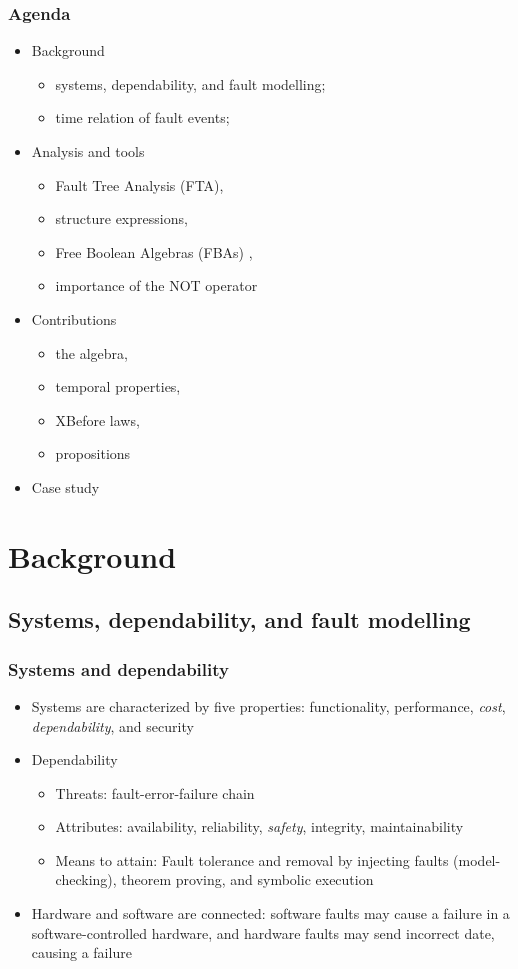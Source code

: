 \documentclass{beamer}
\def\FTA{Fault Tree Analysis (FTA)\gdef\FTA{FTA\xspace}\xspace}
\def\FBA{%
	Free Boolean Algebra (FBA)%
	\gdef\FBA{FBA\xspace}%
	\gdef\FBAs{FBAs\xspace}%
	\gdef\iFBA{an FBA\xspace}%
	\xspace%
}
\def\FBAs{%
	Free Boolean Algebras (FBAs)%
	\gdef\FBA{FBA\xspace}%
	\gdef\FBAs{FBAs\xspace}%
	\gdef\iFBA{an FBA\xspace}%
	\xspace%
}
\def\iFBA{%
	a Free Boolean Algebra (FBA)%
	\gdef\FBA{FBA\xspace}%
	\gdef\FBAs{FBAs\xspace}%
	\gdef\iFBA{an FBA\xspace}%
	\xspace%
}
\begin{document}
\begin{frame}
	\frametitle{Agenda}
	\begin{itemize}
		\item Background
		\begin{itemize}
			\item systems, dependability, and fault modelling; 
			\item time relation of fault events;
		\end{itemize}
		\item Analysis and tools
		\begin{itemize}
			\item \FTA, 
			\item structure expressions, 
			\item \FBAs, 
			\item importance of the NOT operator
		\end{itemize}
		\item Contributions
		\begin{itemize}
			\item the algebra, 
			\item temporal properties, 
			\item XBefore laws, 
			\item propositions
		\end{itemize}
		\item Case study
	\end{itemize}
\end{frame}

\section{Background}

\subsection{Systems, dependability, and fault modelling}

\begin{frame}
	\frametitle{Systems and dependability}
	\begin{itemize}
		\item Systems are characterized by five properties: functionality, performance, \emph{cost}, \emph{dependability}, and security
		\item Dependability
		\begin{itemize}
			\item Threats: fault-error-failure chain
			\item Attributes: availability, reliability, \emph{safety}, integrity, maintainability
			\item Means to attain: Fault tolerance and removal by injecting faults (model-checking), theorem proving, and symbolic execution
		\end{itemize}
		\item Hardware and software are connected: software faults may cause a failure in a software-controlled hardware, and hardware faults may send incorrect date, causing a failure
	\end{itemize}
\end{frame}
\end{document}
